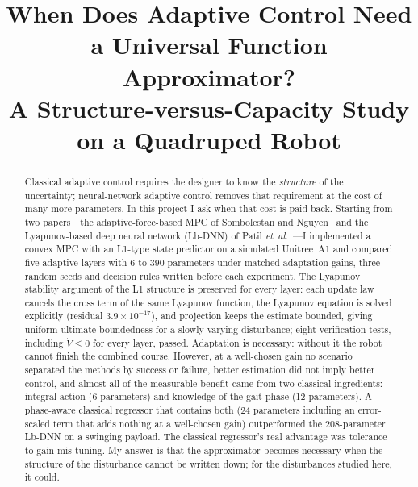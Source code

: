 \documentclass[conference]{IEEEtran}
\begin{document}
\title{When Does Adaptive Control Need a Universal Function Approximator?\\
A Structure-versus-Capacity Study on a Quadruped Robot}

\author{
}

\maketitle

\begin{abstract}
Classical adaptive control requires the designer to know the
\emph{structure} of the uncertainty; neural-network adaptive control
removes that requirement at the cost of many more parameters. In this
project I ask when that cost is paid back. Starting from two papers---the
adaptive-force-based MPC of Sombolestan and Nguyen~\cite{sombolestan2024}
and the Lyapunov-based deep neural network (Lb-DNN) of Patil
\emph{et~al.}~\cite{patil2022}---I implemented a convex MPC with an
L1-type state predictor on a simulated Unitree~A1 and compared five
adaptive layers with 6 to 390 parameters under matched adaptation gains,
three random seeds and decision rules written before each experiment.
The Lyapunov stability argument of the L1 structure is preserved for
every layer: each update law cancels the cross term of the same
Lyapunov function, the Lyapunov equation is solved explicitly (residual
$3.9\times10^{-17}$), and projection keeps the estimate bounded, giving
uniform ultimate boundedness for a slowly varying disturbance; eight
verification tests, including $\dot V\le0$ for every layer, passed.
Adaptation is necessary: without it the robot cannot finish the combined
course. However, at a well-chosen gain no scenario separated the methods
by success or failure, better estimation did not imply better control,
and almost all of the measurable benefit came from two classical
ingredients: integral action (6 parameters) and knowledge of the gait
phase (12 parameters). A phase-aware classical regressor that contains
both (24 parameters including an error-scaled term that adds nothing at
a well-chosen gain) outperformed the 208-parameter Lb-DNN on a swinging
payload. The classical regressor's
real advantage was tolerance to gain mis-tuning. My answer is that the
approximator becomes necessary when the structure of the disturbance
cannot be written down; for the disturbances studied here, it could.
\end{abstract}
\end{document}
